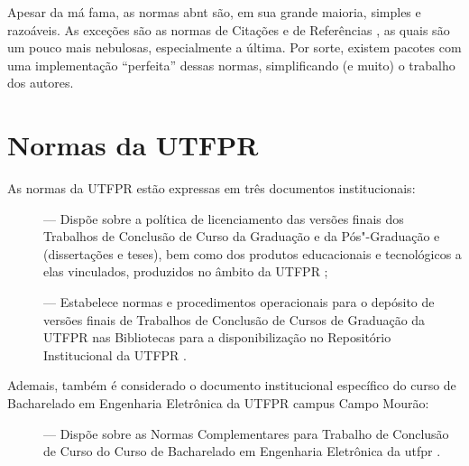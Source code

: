 Apesar da má fama, as normas \ac{abnt} são, em sua grande maioria, simples e razoáveis. As exceções são as normas de Citações \cite{NBR10520} e de Referências \cite{NBR6023}, as quais são um pouco mais nebulosas, especialmente a última. Por sorte, existem pacotes com uma implementação \enquote{perfeita} dessas normas, simplificando (e muito) o trabalho dos autores.

\section{Normas da UTFPR}

As normas da UTFPR estão expressas em três documentos institucionais:
\begin{description}
	\item[] --- Dispõe sobre a política de licenciamento das versões finais dos Trabalhos de Conclusão de Curso da Graduação e da Pós"-Graduação  e  (dissertações e teses), bem como dos produtos educacionais e tecnológicos a elas vinculados, produzidos no âmbito da UTFPR \cite{cogep2021};
	\item[] --- Estabelece normas e procedimentos operacionais para o depósito de versões finais de Trabalhos de Conclusão de Cursos de Graduação da UTFPR nas Bibliotecas para a disponibilização no Repositório Institucional da UTFPR \cite{prograd2021}.
\end{description}

Ademais, também é considerado o documento institucional específico do curso de Bacharelado em Engenharia Eletrônica da UTFPR campus Campo Mourão:
\begin{description}
	\item[] --- Dispõe sobre as Normas Complementares para Trabalho de Conclusão de Curso do Curso de Bacharelado em Engenharia Eletrônica da \ac{utfpr} \cite{coele2023}.
\end{description}
